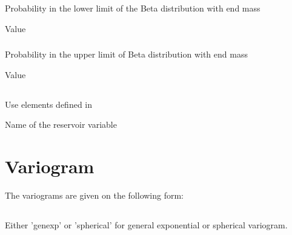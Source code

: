 {\subsubsection{}
 \slist
   \item \Description Probability in the lower limit of the Beta distribution with end mass
   \item \Argument Value
   \item \Default
 \elist

\subsubsection{}
 \slist
   \item \Description Probability in the upper limit of Beta distribution with end mass
   \item \Argument Value
   \item \Default
 \elist

\subsection{}
 \slist
   \item \Description Use elements defined in 
   \item \Argument Name of the reservoir variable
   \item \Default 
 \elist

\section{Variogram}
\label{sec:variogram}
  The variograms are given on the following form:

\subsection{}
 \slist
   \item \Description Either 'genexp' or 'spherical' for general exponential or spherical variogram.
   \item \Argument
   \item \Default
 \elist

}

